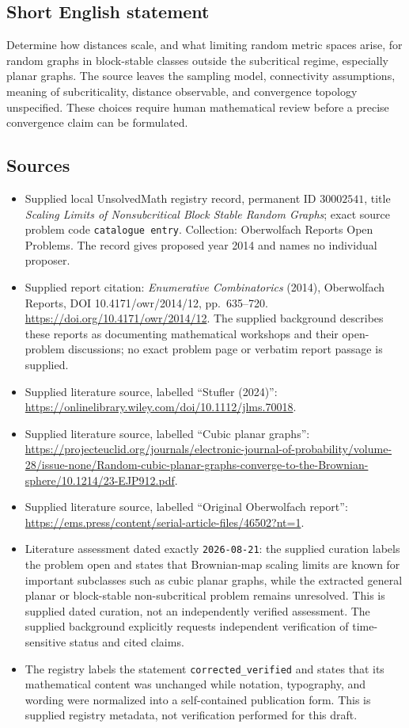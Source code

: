 \documentclass[11pt]{article}
\begin{document}
\subsection{Short English statement}
Determine how distances scale, and what limiting random metric spaces arise, for random graphs in block-stable classes outside the subcritical regime, especially planar graphs. The source leaves the sampling model, connectivity assumptions, meaning of subcriticality, distance observable, and convergence topology unspecified. These choices require human mathematical review before a precise convergence claim can be formulated.
\subsection{Sources}
\begin{itemize}
\item Supplied local UnsolvedMath registry record, permanent ID \(30002541\), title \emph{Scaling Limits of Nonsubcritical Block Stable Random Graphs}; exact source problem code \texttt{catalogue entry}. Collection: Oberwolfach Reports Open Problems. The record gives proposed year 2014 and names no individual proposer.
\item Supplied report citation: \emph{Enumerative Combinatorics} (2014), Oberwolfach Reports, DOI 10.4171/owr/2014/12, pp.\ 635--720. \url{https://doi.org/10.4171/owr/2014/12}. The supplied background describes these reports as documenting mathematical workshops and their open-problem discussions; no exact problem page or verbatim report passage is supplied.
\item Supplied literature source, labelled ``Stufler (2024)'': \url{https://onlinelibrary.wiley.com/doi/10.1112/jlms.70018}.
\item Supplied literature source, labelled ``Cubic planar graphs'': \url{https://projecteuclid.org/journals/electronic-journal-of-probability/volume-28/issue-none/Random-cubic-planar-graphs-converge-to-the-Brownian-sphere/10.1214/23-EJP912.pdf}.
\item Supplied literature source, labelled ``Original Oberwolfach report'': \url{https://ems.press/content/serial-article-files/46502?nt=1}.
\item Literature assessment dated exactly \texttt{2026-08-21}: the supplied curation labels the problem open and states that Brownian-map scaling limits are known for important subclasses such as cubic planar graphs, while the extracted general planar or block-stable non-subcritical problem remains unresolved. This is supplied dated curation, not an independently verified assessment. The supplied background explicitly requests independent verification of time-sensitive status and cited claims.
\item The registry labels the statement \texttt{corrected\_verified} and states that its mathematical content was unchanged while notation, typography, and wording were normalized into a self-contained publication form. This is supplied registry metadata, not verification performed for this draft.
\end{itemize}
\end{document}

